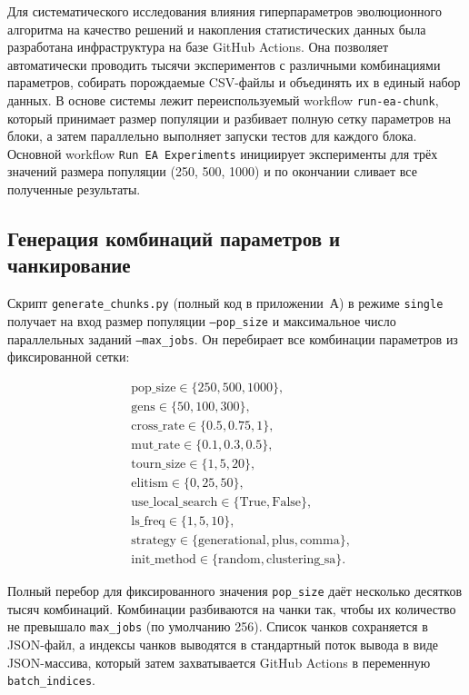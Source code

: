 \documentclass[732]{studrep}
\theoremstyle{nonumberplain}
\begin{document}
Для систематического исследования влияния гиперпараметров эволюционного алгоритма на качество решений и накопления статистических данных была разработана инфраструктура на базе GitHub Actions. Она позволяет автоматически проводить тысячи экспериментов с различными комбинациями параметров, собирать порождаемые CSV-файлы и объединять их в единый набор данных. В основе системы лежит переиспользуемый workflow \texttt{run-ea-chunk}, который принимает размер популяции и разбивает полную сетку параметров на блоки, а затем параллельно выполняет запуски тестов для каждого блока. Основной workflow \texttt{Run EA Experiments} инициирует эксперименты для трёх значений размера популяции (250, 500, 1000) и по окончании сливает все полученные результаты.

\subsection{Генерация комбинаций параметров и чанкирование}

Скрипт \texttt{generate\_chunks.py} (полный код в приложении~А) в режиме \texttt{single} получает на вход размер популяции \texttt{--pop\_size} и максимальное число параллельных заданий \texttt{--max\_jobs}. Он перебирает все комбинации параметров из фиксированной сетки:

\[
\begin{aligned}
&\text{pop\_size} \in \{250, 500, 1000\},\\
&\text{gens} \in \{50, 100, 300\},\\
&\text{cross\_rate} \in \{0.5, 0.75, 1\},\\
&\text{mut\_rate} \in \{0.1, 0.3, 0.5\},\\
&\text{tourn\_size} \in \{1, 5, 20\},\\
&\text{elitism} \in \{0, 25, 50\},\\
&\text{use\_local\_search} \in \{\text{True}, \text{False}\},\\
&\text{ls\_freq} \in \{1, 5, 10\},\\
&\text{strategy} \in \{\text{generational}, \text{plus}, \text{comma}\},\\
&\text{init\_method} \in \{\text{random}, \text{clustering\_sa}\}.
\end{aligned}
\]

Полный перебор для фиксированного значения \texttt{pop\_size} даёт несколько десятков тысяч комбинаций. Комбинации разбиваются на чанки так, чтобы их количество не превышало \texttt{max\_jobs} (по умолчанию 256). Список чанков сохраняется в JSON-файл, а индексы чанков выводятся в стандартный поток вывода в виде JSON-массива, который затем захватывается GitHub Actions в переменную \texttt{batch\_indices}.
\end{document}
